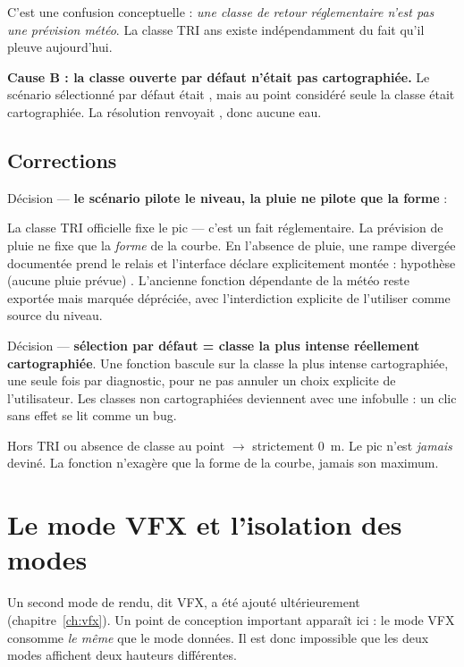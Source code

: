 C'est une confusion conceptuelle : \emph{une classe de retour
réglementaire n'est pas une prévision météo}. La classe TRI  ans \fg{}
existe indépendamment du fait qu'il pleuve aujourd'hui.

\textbf{Cause B : la classe ouverte par défaut n'était pas cartographiée.} Le
scénario sélectionné par défaut était , mais au point considéré
seule la classe  était cartographiée. La résolution renvoyait
, donc aucune eau.

\subsection{Corrections}

Décision  — \textbf{le scénario pilote le niveau, la pluie ne pilote
que la forme} :

\begin{center}
\end{center}

La classe TRI officielle fixe le pic — c'est un fait réglementaire. La
prévision de pluie ne fixe que la \emph{forme} de la courbe. En l'absence de
pluie, une rampe divergée documentée prend le relais et l'interface déclare
explicitement \og montée : hypothèse (aucune pluie prévue) \fg. L'ancienne
fonction dépendante de la météo reste exportée mais marquée dépréciée, avec
l'interdiction explicite de l'utiliser comme source du niveau.

Décision  — \textbf{sélection par défaut = classe la plus intense
réellement cartographiée}. Une fonction bascule sur la classe la plus intense
cartographiée, une seule fois par diagnostic, pour ne pas annuler un choix
explicite de l'utilisateur. Les classes non cartographiées deviennent
 avec une infobulle : un clic sans effet se lit comme un bug.

\begin{invariant}
Hors TRI ou absence de classe au point $\rightarrow$ strictement 0~m. Le pic
n'est \emph{jamais} deviné. La fonction  n'exagère que la
forme de la courbe, jamais son maximum.
\end{invariant}

\section{Le mode VFX et l'isolation des modes}

Un second mode de rendu, dit VFX, a été ajouté ultérieurement
(chapitre~\ref{ch:vfx}). Un point de conception important apparaît ici : le
mode VFX consomme \emph{le même}  que le mode données. Il
est donc impossible que les deux modes affichent deux hauteurs différentes.

